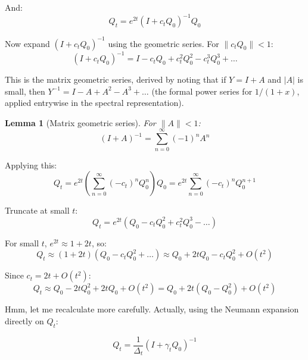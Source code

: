 \documentclass[11pt,a4paper]{article}
\theoremstyle{plain}
\newtheorem{lemma}[theorem]{Lemma}
\theoremstyle{definition}
\newcommand{\Prec}{Q}
\newcommand{\delt}{\Delta_t}
\begin{document}
And:
\begin{equation}
\Prec_t = e^{2t}(I + c_t \Prec_0)^{-1} \Prec_0
\end{equation}

Now expand $(I + c_t \Prec_0)^{-1}$ using the geometric series. For $\|c_t \Prec_0\| < 1$:
\begin{equation}
(I + c_t \Prec_0)^{-1} = I - c_t \Prec_0 + c_t^2 \Prec_0^2 - c_t^3 \Prec_0^3 + \ldots
\end{equation}

This is the matrix geometric series, derived by noting that if $Y = I + A$ and $|A|$ is small, then $Y^{-1} = I - A + A^2 - A^3 + \ldots$ (the formal power series for $1/(1+x)$, applied entrywise in the spectral representation).

\begin{lemma}[Matrix geometric series]
For $\|A\| < 1$:
\begin{equation}
(I + A)^{-1} = \sum_{n=0}^\infty (-1)^n A^n
\end{equation}
\end{lemma}

Applying this:
\begin{equation}
\Prec_t = e^{2t}\left(\sum_{n=0}^\infty (-c_t)^n \Prec_0^n\right) \Prec_0 = e^{2t}\sum_{n=0}^\infty (-c_t)^n \Prec_0^{n+1}
\end{equation}

Truncate at small $t$:
\begin{equation}
\Prec_t = e^{2t}(\Prec_0 - c_t \Prec_0^2 + c_t^2 \Prec_0^3 - \ldots)
\end{equation}

For small $t$, $e^{2t} \approx 1 + 2t$, so:
\begin{equation}
\Prec_t \approx (1 + 2t)(\Prec_0 - c_t \Prec_0^2 + \ldots) \approx \Prec_0 + 2t\Prec_0 - c_t\Prec_0^2 + O(t^2)
\end{equation}

Since $c_t = 2t + O(t^2)$:
\begin{equation}
\Prec_t \approx \Prec_0 - 2t\Prec_0^2 + 2t\Prec_0 + O(t^2) = \Prec_0 + 2t(\Prec_0 - \Prec_0^2) + O(t^2)
\end{equation}

Hmm, let me recalculate more carefully. Actually, using the Neumann expansion directly on $\Prec_t$:

\begin{equation}
\Prec_t = \frac{1}{\delt}(I + \gamma_t \Prec_0)^{-1}
\end{equation}
\end{document}
